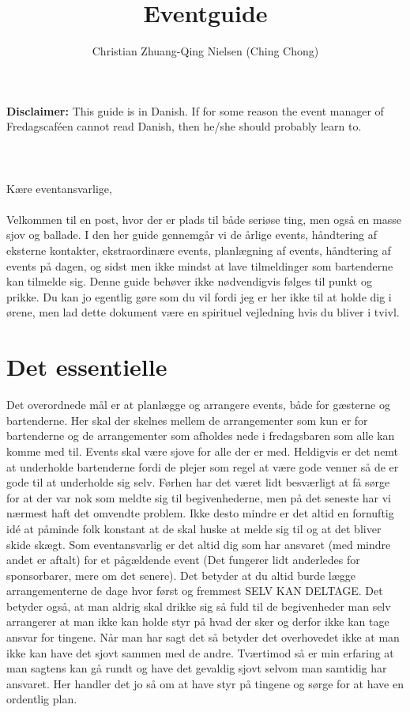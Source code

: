 

\title{Eventguide}
\date{}
\author{Christian Zhuang-Qing Nielsen (Ching Chong)}



\maketitle
\noindent\textbf{Disclaimer:} This guide is in Danish. If for some reason the event manager of Fredagscaféen cannot read Danish, then he/she should probably learn to.
\\ \\ \\ \\
\noindent Kære eventansvarlige,
\\ \\
Velkommen til en post, hvor der er plads til både seriøse ting, men også en masse sjov og ballade. I den her guide gennemgår vi de årlige events, håndtering af eksterne kontakter, ekstraordinære events, planlægning af events, håndtering af events på dagen, og sidst men ikke mindst at lave tilmeldinger som bartenderne kan tilmelde sig. Denne guide behøver ikke nødvendigvis følges til punkt og prikke. Du kan jo egentlig gøre som du vil fordi jeg er her ikke til at holde dig i ørene, men lad dette dokument være en spirituel vejledning hvis du bliver i tvivl.

\section*{Det essentielle}
\label{sec:det-essentielle}

Det overordnede mål er at planlægge og arrangere events, både for gæsterne
og bartenderne. Her skal der skelnes mellem de arrangementer som kun er for bartenderne og de arrangementer som afholdes nede i fredagsbaren som alle kan komme med til. Events skal være sjove for alle der er med. Heldigvis er det nemt at underholde bartenderne fordi de plejer som regel at være gode venner så de er gode til at underholde sig selv. Førhen har det været lidt besværligt at få sørge for at der var nok som meldte sig til begivenhederne, men på det seneste har vi nærmest haft det omvendte problem. Ikke desto mindre er det altid en fornuftig idé at påminde folk konstant at de skal huske at melde sig til og at det bliver skide skægt. Som eventansvarlig er det altid dig som har ansvaret (med mindre andet er aftalt) for et pågældende event (Det fungerer lidt anderledes for sponsorbarer, mere om det senere). Det betyder at du altid burde lægge arrangementerne de dage hvor først og fremmest SELV KAN DELTAGE. Det betyder også, at man aldrig skal drikke sig så fuld til de begivenheder man selv arrangerer at man ikke kan holde styr på hvad der sker og derfor ikke kan tage ansvar for tingene. Når man har sagt det så betyder det overhovedet ikke at man ikke kan have det sjovt sammen med de andre. Tværtimod så er min erfaring at man sagtens kan gå rundt og have det gevaldig sjovt selvom man samtidig har ansvaret. Her handler det jo så om at have styr på tingene og sørge for at have en ordentlig plan.

